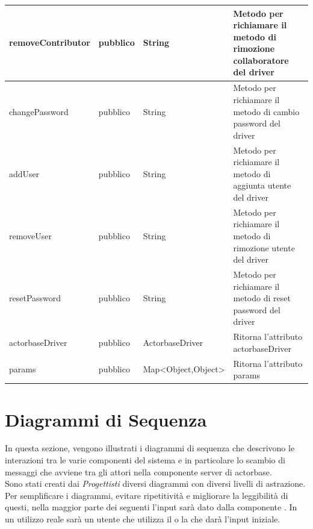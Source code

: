 \documentclass{scalatekids-article}
\begin{document}
\begin{tabular}{| l | l | l | l |}
  \hline
  removeContributor & pubblico & String & Metodo per richiamare il metodo di rimozione collaboratore del driver\\
  \hline
  changePassword & pubblico & String & Metodo per richiamare il metodo di cambio password del driver\\
  \hline
  addUser & pubblico & String & Metodo per richiamare il metodo di aggiunta utente del driver\\
  \hline
  removeUser & pubblico & String & Metodo per richiamare il metodo di rimozione utente del driver\\
  \hline
  resetPassword & pubblico & String & Metodo per richiamare il metodo di reset password del driver\\
  \hline
  actorbaseDriver & pubblico & ActorbaseDriver & Ritorna l'attributo actorbaseDriver\\
  \hline
  params & pubblico & Map<Object,Object> & Ritorna l'attributo params\\
  \hline
\end{tabular}

\section{Diagrammi di Sequenza}

In questa sezione, vengono illustrati i diagrammi di sequenza che descrivono
le interazioni tra le varie componenti del sistema e in particolare lo scambio
di messaggi che avviene tra gli attori nella componente server di actorbase.\\
Sono stati creati dai \textit{Progettisti} diversi diagrammi con diversi livelli
di astrazione.\\
Per semplificare i diagrammi, evitare ripetitività e migliorare la leggibilità di
questi, nella maggior parte dei seguenti l'input sarà dato dalla componente . In un utilizzo reale sarà un utente che utilizza il  o la
 che darà l'input iniziale.
\end{document}
